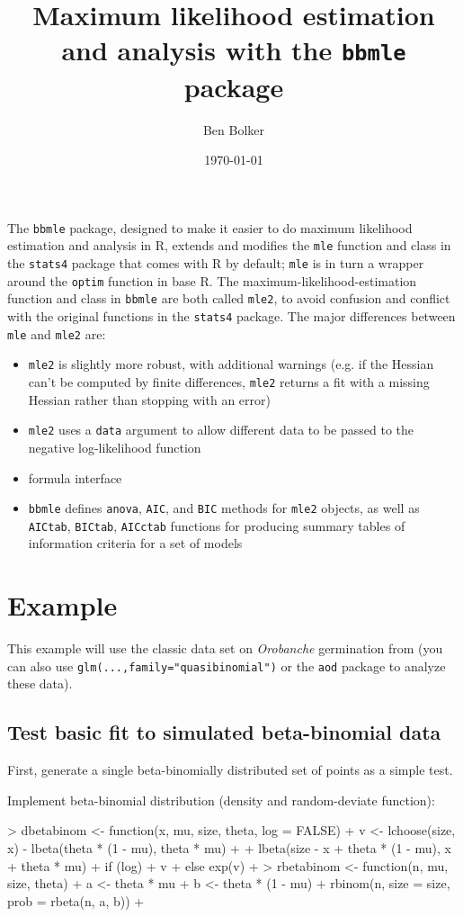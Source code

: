 \documentclass{article}
\author{Ben Bolker}
\title{Maximum likelihood estimation and analysis
  with the {\tt bbmle} package}
\date{\today}
\newcommand{\code}[1]{{\tt #1}}
\begin{document}

\maketitle


The \code{bbmle} package, designed to make it easier to
do maximum likelihood estimation and analysis in R,
extends and modifies the \code{mle} function and class
in the \code{stats4} package that comes with R by default;
\code{mle} is in turn a wrapper around the \code{optim}
function in base R.
The maximum-likelihood-estimation function and class
in \code{bbmle} are both called \code{mle2}, to avoid
confusion and conflict with the original functions in
the \code{stats4} package.  The major differences between
\code{mle} and \code{mle2} are:
\begin{itemize}
\item \code{mle2} is slightly
   more robust, with additional warnings (e.g.
  if the Hessian can't be computed by finite differences,
  \code{mle2} returns a fit with a missing Hessian rather
  than stopping with an error)
\item \code{mle2} uses a \code{data} argument to allow different
  data to be passed to the negative log-likelihood function
\item formula interface
\item \code{bbmle} defines {\tt anova}, {\tt AIC}, and {\tt BIC} methods for
  \code{mle2} objects, as well as
  \code{AICtab}, \code{BICtab}, \code{AICctab}
  functions for producing summary tables of information criteria for a 
  set of models
\end{itemize}

\section{Example}

This example will use the classic data set on
\emph{Orobanche} germination from \cite{Crowder1978}
(you can also use
\code{glm(...,family="quasibinomial")} or
the \code{aod} package to analyze these data).


\subsection{Test basic fit to simulated beta-binomial data}

First, generate a single beta-binomially distributed
set of points as a simple test.

Implement beta-binomial distribution (density and random-deviate function):
\begin{Schunk}
\begin{Sinput}
> dbetabinom <- function(x, mu, size, theta, log = FALSE) {
+     v <- lchoose(size, x) - lbeta(theta * (1 - mu), theta * mu) + 
+         lbeta(size - x + theta * (1 - mu), x + theta * mu)
+     if (log) 
+         v
+     else exp(v)
+ }
> rbetabinom <- function(n, mu, size, theta) {
+     a <- theta * mu
+     b <- theta * (1 - mu)
+     rbinom(n, size = size, prob = rbeta(n, a, b))
+ }
\end{Sinput}
\end{Schunk}
\end{document}
